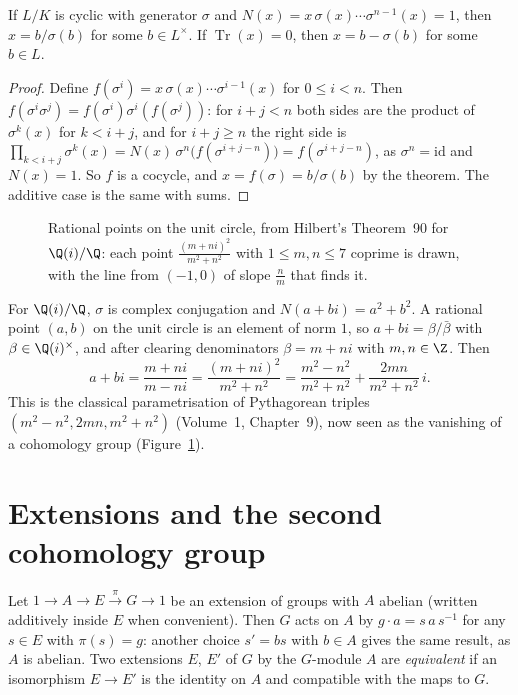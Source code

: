 \begin{corollary}\label{cor:hilbert90}
If $L/K$ is cyclic with generator $\sigma$ and $N(x)=x\,\sigma(x)\cdots\sigma^{n-1}(x)=1$, then $x=b/\sigma(b)$ for some $b\in L^\times$. If $\operatorname{Tr}(x)=0$, then $x=b-\sigma(b)$ for some $b\in L$.
\end{corollary}

\begin{proof}
Define $f(\sigma^i)=x\,\sigma(x)\cdots\sigma^{i-1}(x)$ for $0\le i<n$. Then $f(\sigma^i\sigma^j)=f(\sigma^i)\sigma^i(f(\sigma^j))$: for $i+j<n$ both sides are the product of $\sigma^k(x)$ for $k<i+j$, and for $i+j\ge n$ the right side is
$\prod_{k<i+j}\sigma^k(x)=N(x)\,\sigma^n\bigl(f(\sigma^{i+j-n})\bigr)=f(\sigma^{i+j-n})$, as $\sigma^n=\mathrm{id}$ and $N(x)=1$. So $f$ is a cocycle, and $x=f(\sigma)=b/\sigma(b)$ by the theorem. The additive case is the same with sums.
\end{proof}

\begin{figure}[ht]
\centering
{}
\caption{Rational points on the unit circle, from Hilbert's Theorem~90 for $\Q(i)/\Q$: each point $\frac{(m+ni)^2}{m^2+n^2}$ with $1\le m,n\le7$ coprime is drawn, with the line from $(-1,0)$ of slope $\frac nm$ that finds it.}
\label{fig:rationalcircle}
\end{figure}

\begin{example}\label{ex:pythagoras}
For $\Q(i)/\Q$, $\sigma$ is complex conjugation and $N(a+bi)=a^2+b^2$. A rational point $(a,b)$ on the unit circle is an element of norm $1$, so $a+bi=\beta/\bar\beta$ with $\beta\in\Q(i)^\times$, and after clearing denominators
$\beta=m+ni$ with $m,n\in\Z$. Then
\[
a+bi=\frac{m+ni}{m-ni}=\frac{(m+ni)^2}{m^2+n^2}=\frac{m^2-n^2}{m^2+n^2}+\frac{2mn}{m^2+n^2}\,i.
\]
This is the classical parametrisation of Pythagorean triples $(m^2-n^2,2mn,m^2+n^2)$ (Volume~1, Chapter~9), now seen as the vanishing of a cohomology group (Figure~\ref{fig:rationalcircle}).
\end{example}

\section{Extensions and the second cohomology group}\label{sec:extensions}

Let $1\to A\xrightarrow{}E\xrightarrow{\pi}G\to1$ be an extension of groups with $A$ abelian (written additively inside $E$ when convenient). Then $G$ acts on $A$ by $g\cdot a=s\,a\,s^{-1}$ for any $s\in E$ with $\pi(s)=g$: another
choice $s'=bs$ with $b\in A$ gives the same result, as $A$ is abelian. Two extensions $E$, $E'$ of $G$ by the $G$-module $A$ are \emph{equivalent} if an isomorphism $E\to E'$ is the identity on $A$ and compatible with the maps to $G$.

